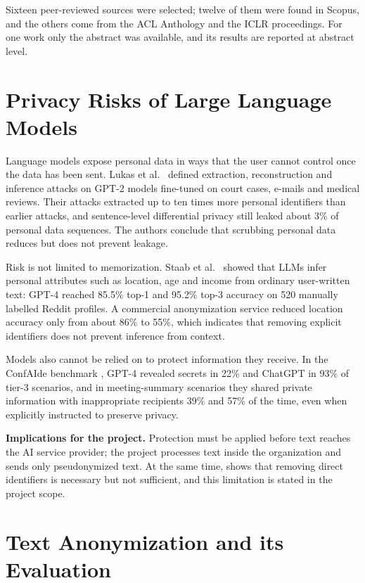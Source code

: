 \documentclass[12pt,a4paper]{article}
\begin{document}
Sixteen peer-reviewed sources were selected; twelve of them were found in Scopus, and the others come from the ACL Anthology and the ICLR proceedings. For one work \cite{r15} only the abstract was available, and its results are reported at abstract level.

\section{Privacy Risks of Large Language Models}

Language models expose personal data in ways that the user cannot control once the data has been sent. Lukas et al.~\cite{r1} defined extraction, reconstruction and inference attacks on GPT-2 models fine-tuned on court cases, e-mails and medical reviews. Their attacks extracted up to ten times more personal identifiers than earlier attacks, and sentence-level differential privacy still leaked about 3\% of personal data sequences. The authors conclude that scrubbing personal data reduces but does not prevent leakage.

Risk is not limited to memorization. Staab et al.~\cite{r2} showed that LLMs infer personal attributes such as location, age and income from ordinary user-written text: GPT-4 reached 85.5\% top-1 and 95.2\% top-3 accuracy on 520 manually labelled Reddit profiles. A commercial anonymization service reduced location accuracy only from about 86\% to 55\%, which indicates that removing explicit identifiers does not prevent inference from context.

Models also cannot be relied on to protect information they receive. In the ConfAIde benchmark \cite{r3}, GPT-4 revealed secrets in 22\% and ChatGPT in 93\% of tier-3 scenarios, and in meeting-summary scenarios they shared private information with inappropriate recipients 39\% and 57\% of the time, even when explicitly instructed to preserve privacy.

\textbf{Implications for the project.} Protection must be applied before text reaches the AI service provider; the project processes text inside the organization and sends only pseudonymized text. At the same time, \cite{r2} shows that removing direct identifiers is necessary but not sufficient, and this limitation is stated in the project scope.

\section{Text Anonymization and its Evaluation}
\end{document}
